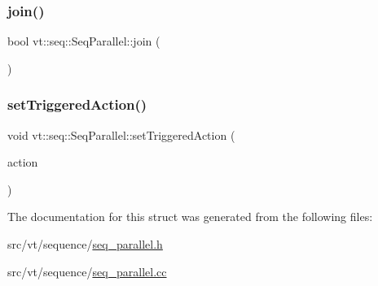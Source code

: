 \subsubsection{\texorpdfstring{join()}{join()}}
{\footnotesize\ttfamily bool vt\+::seq\+::\+Seq\+Parallel\+::join (\begin{DoxyParamCaption}{ }\end{DoxyParamCaption})}

\mbox{\label{structvt_1_1seq_1_1_seq_parallel_a19b3844758dcb47670d7fa428f6c7b7c}} 
\subsubsection{\texorpdfstring{set\+Triggered\+Action()}{setTriggeredAction()}}
{\footnotesize\ttfamily void vt\+::seq\+::\+Seq\+Parallel\+::set\+Triggered\+Action (\begin{DoxyParamCaption}\item[{\hyperlink{namespacevt_ae0a5a7b18cc99d7b732cb4d44f46b0f3}{Action\+Type}}]{action }\end{DoxyParamCaption})}



The documentation for this struct was generated from the following files\+:\begin{DoxyCompactItemize}
\item 
src/vt/sequence/\hyperlink{seq__parallel_8h}{seq\+\_\+parallel.\+h}\item 
src/vt/sequence/\hyperlink{seq__parallel_8cc}{seq\+\_\+parallel.\+cc}\end{DoxyCompactItemize}

